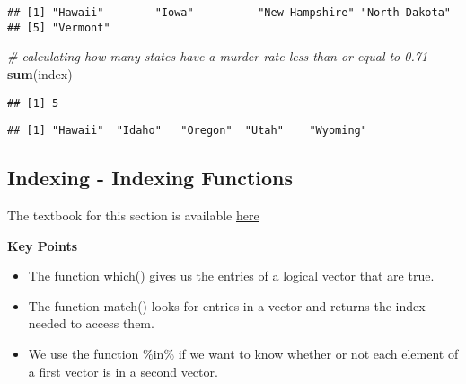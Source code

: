 \documentclass[
]{article}
\newenvironment{Shaded}{\begin{snugshade}}{\end{snugshade}}
\newcommand{\CommentTok}[1]{\textcolor[rgb]{0.56,0.35,0.01}{\textit{#1}}}
\newcommand{\DecValTok}[1]{\textcolor[rgb]{0.00,0.00,0.81}{#1}}
\newcommand{\KeywordTok}[1]{\textcolor[rgb]{0.13,0.29,0.53}{\textbf{#1}}}
\newcommand{\NormalTok}[1]{#1}
\newcommand{\OperatorTok}[1]{\textcolor[rgb]{0.81,0.36,0.00}{\textbf{#1}}}
\newcommand{\StringTok}[1]{\textcolor[rgb]{0.31,0.60,0.02}{#1}}
\providecommand{\tightlist}{%
  \setlength{\itemsep}{0pt}\setlength{\parskip}{0pt}}
\begin{document}
\begin{verbatim}
## [1] "Hawaii"        "Iowa"          "New Hampshire" "North Dakota" 
## [5] "Vermont"
\end{verbatim}

\begin{Shaded}
\begin{Highlighting}[]
\CommentTok{# calculating how many states have a murder rate less than or equal to 0.71}
\KeywordTok{sum}\NormalTok{(index)}
\end{Highlighting}
\end{Shaded}

\begin{verbatim}
## [1] 5
\end{verbatim}

\begin{Shaded}
\end{Shaded}

\begin{verbatim}
## [1] "Hawaii"  "Idaho"   "Oregon"  "Utah"    "Wyoming"
\end{verbatim}

\hypertarget{indexing---indexing-functions}{%
\subsection{Indexing - Indexing
Functions}\label{indexing---indexing-functions}}

The textbook for this section is available
\href{https://rafalab.github.io/dsbook/r-basics.html\#which}{here}

\textbf{Key Points}

\begin{itemize}
\tightlist
\item
  The function which() gives us the entries of a logical vector that are
  true.
\item
  The function match() looks for entries in a vector and returns the
  index needed to access them.
\item
  We use the function \%in\% if we want to know whether or not each
  element of a first vector is in a second vector.
\end{itemize}
\end{document}
